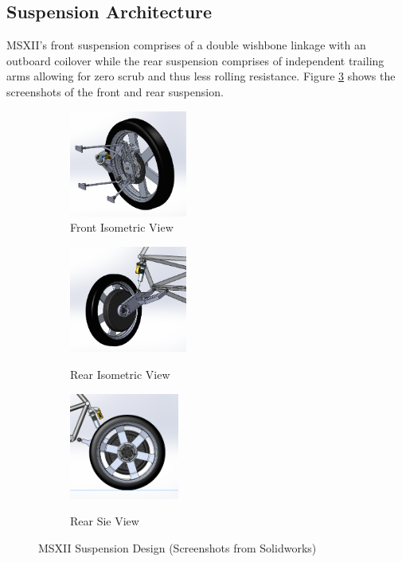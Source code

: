 \documentclass[12pt]{article}
\begin{document}
\subsection{Suspension Architecture}
MSXII's front suspension comprises of a double wishbone linkage with an outboard coilover while the rear suspension comprises of independent trailing arms allowing for zero scrub and thus less rolling resistance. Figure \ref{fig:solidworksScreenshots} shows the screenshots of the front and rear suspension.  
\begin{figure}[htbp]
	\centering
    \begin{subfigure}[b]{.32\textwidth}
		\caption{Front Isometric View}
		\centering
        \includegraphics[height=3.5cm]{./LaTex/frontIso.PNG}
    \end{subfigure}
    \begin{subfigure}[b]{.32\textwidth}
		\caption{Rear Isometric View}
		\centering
        \includegraphics[height=3.5cm]{./LaTex/rearIso.PNG}
        \label{fig:c8}
    \end{subfigure}
    \begin{subfigure}[b]{.32\textwidth}
		\caption{Rear Sie View}
		\centering
        \includegraphics[height=3.5cm]{./LaTex/rearRight.PNG}
        \label{fig:c9}
    \end{subfigure}
    \caption{MSXII Suspension Design (Screenshots from Solidworks)}
	\label{fig:solidworksScreenshots}
\end{figure}
\end{document}
